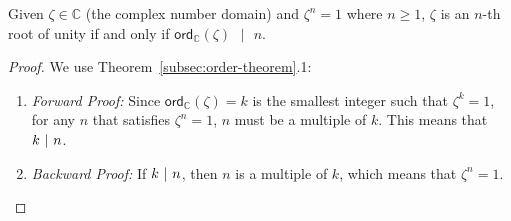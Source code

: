 \begin{tcolorbox}[title={\textbf{\tboxtheorem{\ref*{subsec:roots-theorem}.2} Order of the Root of Unity}}]
Given $\zeta \in \mathbb{C}$ (the complex number domain) and $\zeta^n = 1$ where $n \geq 1$, $\zeta$ is an $n$-th root of unity if and only if $\textsf{ord}_\mathbb{C}(\zeta) \text{ } | \text{ } n$.
\end{tcolorbox}
\begin{proof}
    We use 
    Theorem~\ref*{subsec:order-theorem}.1:
    \begin{enumerate}
    \item \textit{Forward Proof:} Since $\textsf{ord}_\mathbb{C}(\zeta)=k$ is the smallest integer such that $\zeta^k = 1$, for any $n$ that satisfies $\zeta^n = 1$, $n$ must be a multiple of $k$. This means that $k \text{ } \text{$|$} \text{ } n$.
    \item \textit{Backward Proof:} If $k \text{ } \text{$|$} \text{ } n$, then $n$ is a multiple of $k$, which means that $\zeta^n = 1$. 
    \end{enumerate}
\end{proof}

